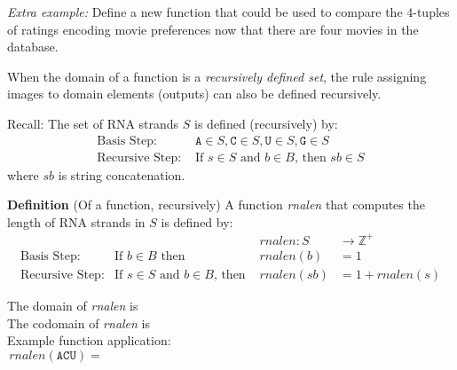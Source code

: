 \documentclass[12pt, oneside]{article}
\newcommand{\A}[0]{\texttt{A}}
\newcommand{\C}[0]{\texttt{C}}
\newcommand{\G}[0]{\texttt{G}}
\newcommand{\U}[0]{\texttt{U}}
\begin{document}
{\it Extra example:} Define a new function that could be used to compare the $4$-tuples of ratings encoding
movie preferences now that there are four movies in the database.

\vfill
\newpage 

When the domain of a function is a {\it recursively defined set}, the rule assigning 
images to domain elements (outputs) can also be defined recursively.

Recall: The set of RNA strands $S$ is defined (recursively) by:
\[
\begin{array}{ll}
\textrm{Basis Step: } & \A \in S, \C \in S, \U \in S, \G \in S \\
\textrm{Recursive Step: } & \textrm{If } s \in S\textrm{ and }b \in B \textrm{, then }sb \in S
\end{array}
\]
where $sb$ is string concatenation.

{\bf Definition} (Of a function, recursively) A function \textit{rnalen} that computes the length of RNA strands in $S$ is defined by:
\[
\begin{array}{llll}
& & \textit{rnalen} : S & \to \mathbb{Z}^+ \\
\textrm{Basis Step:} & \textrm{If } b \in B\textrm{ then } & \textit{rnalen}(b) & = 1 \\
\textrm{Recursive Step:} & \textrm{If } s \in S\textrm{ and }b \in B\textrm{, then  } & \textit{rnalen}(sb) & = 1 + \textit{rnalen}(s)
\end{array}
\]

The domain of \textit{rnalen} is \phantom{$S$}\\

The codomain of \textit{rnalen} is \\

Example function application:
\[
rnalen(\A\C\U) = \phantom{1+ rnalen(\A\C) = 1 + (1 + rnalen(\A) ) = 1 + ( 1 + 1) = 3}
\]

\vfill
\end{document}
